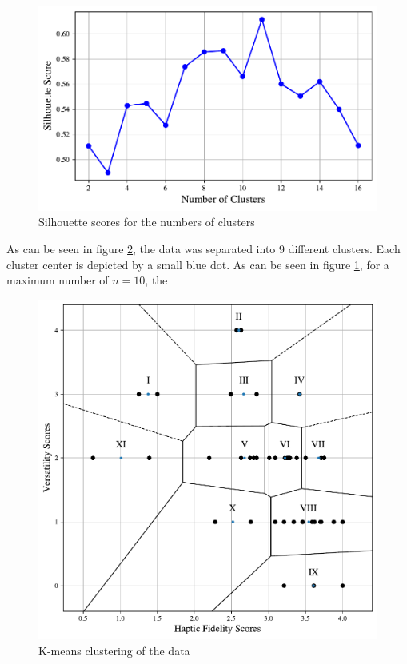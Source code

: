 \begin{figure}[htbp]
    \centering
    \includegraphics[width=\columnwidth]{figures/silhouette.pdf} 
    \caption{Silhouette scores for the numbers of clusters}
    \label{fig:silhouette}
\end{figure}

As can be seen in figure \ref{fig:kmeans}, the data was separated into 9 different clusters. Each cluster center is depicted by a small blue dot. As can be seen in figure \ref{fig:silhouette}, for a maximum number of $n=10$, the 

\begin{figure}[htbp]
    \centering
    \includegraphics[width=\columnwidth]{figures/literature_data.pdf} 
    \caption{K-means clustering of the data}
    \label{fig:kmeans}
\end{figure}


